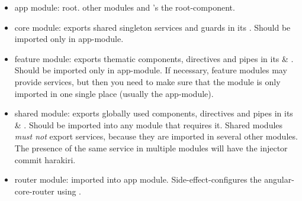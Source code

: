 \begin{itemize}
    \item app module: root.  other modules and 's the root-component.
    \item core module: exports shared singleton services and guards in its . Should be imported only in app-module.
    \item feature module: exports thematic components, directives and pipes in its  & . Should be imported only in app-module.
                If necessary, feature modules may provide services, but then you need to make sure that the module is only imported in one single place (usually the app-module).
    \item shared module: exports globally used components, directives and pipes in its  & . Should be imported into any module that requires it.
                Shared modules \emph{must not} export services, because they are imported in several other modules. The presence of the same service in multiple modules will have the injector commit harakiri.
    \item router module: imported into app module. Side-effect-configures the angular-core-router using .
\end{itemize}